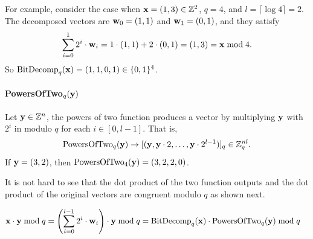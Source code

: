 \documentclass[../main.tex]{subfiles}
\begin{document}
For example, consider the case when $\mathbf{x}=(1,3) \in \mathbb{Z}^2$, $q=4$, and $l=\lceil \log 4 \rceil =2$. The decomposed vectors are $\mathbf{w}_0=(1,1)$ and $\mathbf{w}_1=(0,1)$, and they satisfy \begin{align*}
    \sum_{i=0}^1 2^i \cdot \mathbf{w}_i = 1 \cdot (1,1) + 2 \cdot (0,1) = (1,3)=\mathbf{x} \bmod 4.
\end{align*}
So $\text{BitDecomp}_q(\mathbf{x}) = (1,1,0,1) \in \{0,1\}^4$.

\paragraph{PowersOfTwo$_q(\mathbf{y})$} Let $\mathbf{y} \in \mathbb{Z}^n$, the powers of two function produces a vector by multiplying $\mathbf{y}$ with $2^i$ in modulo $q$ for each $i \in [0, l-1]$. That is, 
\begin{align*}
    \text{PowersOfTwo}_q(\mathbf{y}) \rightarrow [(\mathbf{y}, \mathbf{y} \cdot 2, \dots, \mathbf{y} \cdot 2^{l-1})]_q \in \mathbb{Z}_q^{n l}.
\end{align*}
If $\mathbf{y}=(3,2)$, then $\text{PowersOfTwo}_4(\mathbf{y})=(3,2,2,0)$.

It is not hard to see that the dot product of the two function outputs and the dot product of the original vectors are congruent modulo $q$ as shown next.  

\begin{align*}
    \mathbf{x} \cdot \mathbf{y} \bmod q &= \left(\sum_{i=0}^{l-1} 2^i \cdot \mathbf{w}_i \right) \cdot \mathbf{y} \bmod q 
    = \text{BitDecomp}_q(\mathbf{x}) \cdot \text{PowersOfTwo}_q(\mathbf{y}) \bmod q
\end{align*}
\end{document}
